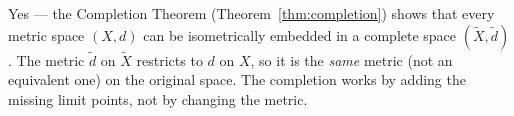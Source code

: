 \begin{remark*}
Yes --- the Completion Theorem (Theorem~\ref{thm:completion}) shows that
every metric space $(X, d)$ can be isometrically embedded in a complete space
$(\widetilde{X}, \widetilde{d})$.
The metric $\widetilde{d}$ on $\widetilde{X}$ restricts to $d$ on $X$, so
it is the \emph{same} metric (not an equivalent one) on the original space.
The completion works by adding the missing limit points, not by changing the metric.
\end{remark*}
